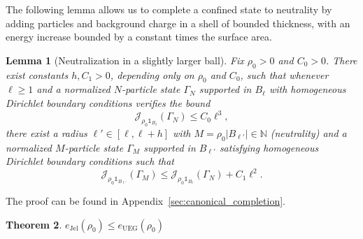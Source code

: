 \documentclass[final,reqno]{amsart}
\newtheorem{theorem}{Theorem}[section]
\newtheorem{lemma}[theorem]{Lemma}
\theoremstyle{remark}
\theoremstyle{definition}
\renewcommand{\le}{\leqslant}
\renewcommand{\ge}{\geqslant}
\newcommand{\NN}{\mathbb{N}}
\newcommand{\iden}{\mathbb{1}}
\newcommand{\UEG}{\mathrm{UEG}}
\newcommand{\Jel}{\mathrm{Jel}}
\begin{document}
The following lemma allows us to complete a confined state to neutrality by adding particles and background charge in a shell of bounded thickness, with an energy increase bounded by a constant times the surface area.
\begin{lemma}[Neutralization in a slightly larger ball]\label{lem:lower_completion}
Fix $\rho_0>0$ and $C_0>0$. There exist constants $h,C_1>0$, depending only on $\rho_0$ and $C_0$, such that
whenever  $\ell\ge1$ and a normalized $N$-particle state $\Gamma_N$ supported in $B_\ell$ with homogeneous Dirichlet boundary conditions verifies the bound
\[
\mathcal J_{\rho_0\iden_{B_\ell}}(\Gamma_N)\le C_0\ell^3,
\]
there exist a radius $\ell'\in[\ell,\ell+h]$ with $M=\rho_0|B_{\ell'}|\in\NN$ (neutrality) and a normalized $M$-particle state $\Gamma_M$ supported in $B_{\ell'}$ satisfying homogeneous Dirichlet boundary conditions such that
\begin{equation}\label{eq:lower_completion}
\mathcal J_{\rho_0\iden_{B_{\ell'}}}(\Gamma_M)
\le\mathcal J_{\rho_0\iden_{B_\ell}}(\Gamma_N)+C_1\ell^2.
\end{equation}
\end{lemma}
The proof can be found in Appendix~\ref{sec:canonical_completion}.

\begin{theorem}\label{thm:lower}
$e_\Jel(\rho_0)\le e_\UEG(\rho_0)$
\end{theorem}
\end{document}
